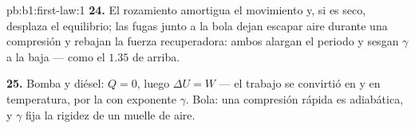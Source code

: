 \begin{solution}{pb:b1:first-law:1}
\textbf{24.} El rozamiento amortigua el movimiento y, si es seco, desplaza
el equilibrio; las fugas junto a la bola dejan escapar aire durante una
compresión y rebajan la fuerza recuperadora: ambos alargan el periodo y
sesgan $\gamma$ a la baja --- como el $1.35$ de arriba.

\textbf{25.} Bomba y diésel: $Q = 0$, luego $\Delta U = W$ --- el trabajo se
convirtió en  y en temperatura, por la  con
exponente $\gamma$. Bola: una compresión rápida es adiabática, y $\gamma$
fija la rigidez de un muelle de aire.
\end{solution}
